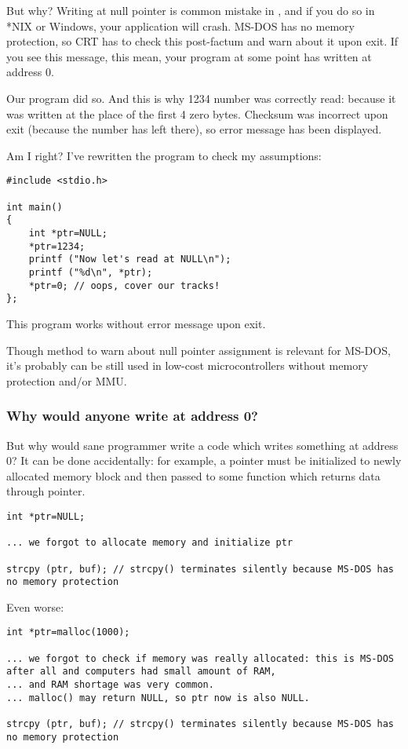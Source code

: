 But why? Writing at null pointer is common mistake in \CCpp, and if you do so in *NIX or Windows, your application will crash.
MS-DOS has no memory protection, so CRT has to check this post-factum and warn about it upon exit.
If you see this message, this mean, your program at some point has written at address 0.

Our program did so. And this is why 1234 number was correctly read: because it was written at the place of the first 4 zero bytes.
Checksum was incorrect upon exit (because the number has left there), so error message has been displayed.

Am I right?
I've rewritten the program to check my assumptions:

\begin{lstlisting}
#include <stdio.h>

int main()
{
	int *ptr=NULL;
	*ptr=1234;
	printf ("Now let's read at NULL\n");
	printf ("%d\n", *ptr);
	*ptr=0; // oops, cover our tracks!
};
\end{lstlisting}

This program works without error message upon exit.

Though method to warn about null pointer assignment is relevant for MS-DOS,
it's probably can be still used in low-cost microcontrollers without memory protection and/or \ac{MMU}.

\subsubsection{Why would anyone write at address 0?}

But why would sane programmer write a code which writes something at address 0?
It can be done accidentally: for example, a pointer must be initialized to newly allocated memory block and then passed to some function which returns data through pointer.

\begin{lstlisting}
int *ptr=NULL;

... we forgot to allocate memory and initialize ptr

strcpy (ptr, buf); // strcpy() terminates silently because MS-DOS has no memory protection
\end{lstlisting}

Even worse:

\begin{lstlisting}
int *ptr=malloc(1000);

... we forgot to check if memory was really allocated: this is MS-DOS after all and computers had small amount of RAM,
... and RAM shortage was very common.
... malloc() may return NULL, so ptr now is also NULL.

strcpy (ptr, buf); // strcpy() terminates silently because MS-DOS has no memory protection
\end{lstlisting}

